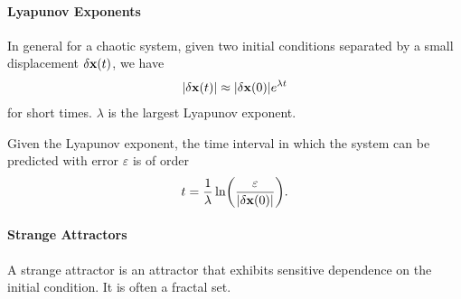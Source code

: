 \paragraph{Lyapunov Exponents}
In general for a chaotic system, given two initial conditions separated by a small displacement $\delta\vb{x}(t)$, we have
\begin{align*}
	\abs{\delta\vb{x}(t)} \approx \abs{\delta\vb{x}(0)}e^{\lambda t}
\end{align*}
for short times. $\lambda$ is the largest Lyapunov exponent.

Given the Lyapunov exponent, the time interval in which the system can be predicted with error $\varepsilon$ is of order
\begin{align*}
	t = \frac{1}{\lambda}\ln(\frac{\varepsilon}{\abs{\delta\vb{x}(0)}}).
\end{align*}

\paragraph{Strange Attractors}
A strange attractor is an attractor that exhibits sensitive dependence on the initial condition. It is often a fractal set.